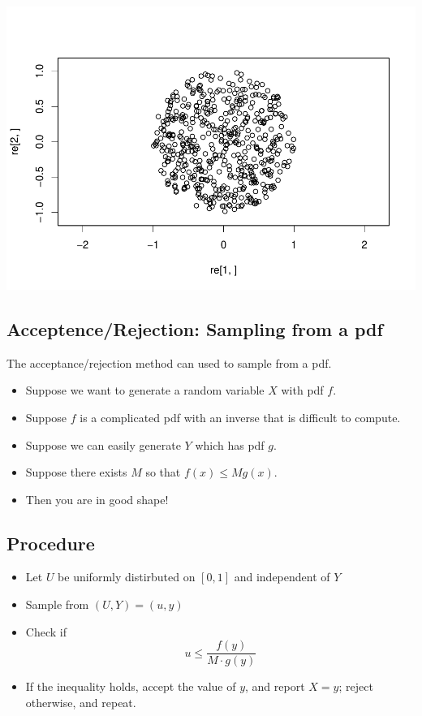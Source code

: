 \documentclass[
]{article}
\providecommand{\tightlist}{%
  \setlength{\itemsep}{0pt}\setlength{\parskip}{0pt}}
\theoremstyle{definition}
\theoremstyle{definition}
\theoremstyle{definition}
\theoremstyle{definition}
\theoremstyle{remark}
\begin{document}
\includegraphics{randomTP_files/figure-latex/unnamed-chunk-3-1.pdf}

\hypertarget{acceptencerejection-sampling-from-a-pdf}{%
\subsection{Acceptence/Rejection: Sampling from a pdf}\label{acceptencerejection-sampling-from-a-pdf}}

The acceptance/rejection method can used to sample from a pdf.

\begin{itemize}
\item
  Suppose we want to generate a random variable \(X\) with pdf \(f\).
\item
  Suppose \(f\) is a complicated pdf with an inverse that is difficult to compute.
\item
  Suppose we can easily generate \(Y\) which has pdf \(g\).
\item
  Suppose there exists \(M\) so that \(f(x) \leq M g(x)\).
\item
  Then you are in good shape!
\end{itemize}

\hypertarget{procedure}{%
\subsection{Procedure}\label{procedure}}

\begin{itemize}
\tightlist
\item
  Let \(U\) be uniformly distirbuted on \([0,1]\) and independent of \(Y\)
\item
  Sample from \((U, Y) = (u, y)\)
\item
  Check if
  \[ u \leq  \frac{f(y)}{M \cdot g(y)}\]
\item
  If the inequality holds, accept the value of \(y\), and report \(X=y\); reject otherwise, and repeat.
\end{itemize}
\end{document}
